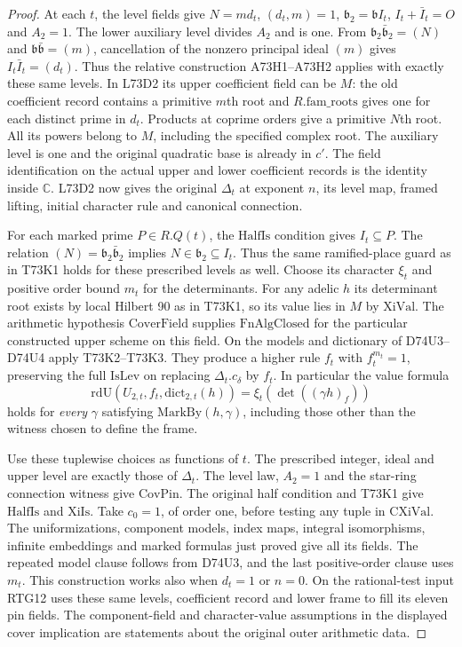 \begin{proof}
At each $t$, the level fields give $N=md_t$, $(d_t,m)=1$,
$\mathfrak b_2=\mathfrak b I_t$, $I_t+\bar I_t=O$ and $A_2=1$.
The lower auxiliary level divides $A_2$ and is one. From
$\mathfrak b_2\bar{\mathfrak b}_2=(N)$ and
$\mathfrak b\bar{\mathfrak b}=(m)$, cancellation of the nonzero
principal ideal $(m)$ gives $I_t\bar I_t=(d_t)$.
Thus the relative construction A73H1--A73H2 applies with exactly
these same levels. In L73D2 its upper coefficient field can be $M$:
the old coefficient record contains a primitive $m$th root and
$R.\mathrm{fam\_roots}$ gives one for each distinct prime in
$d_t$. Products at coprime orders give a primitive $N$th root.
All its powers belong to $M$, including the specified complex root.
The auxiliary level is one and the original quadratic base is already
in $c'$. The field identification on the actual upper and lower
coefficient records is the identity inside $\mathbb C$. L73D2 now
gives the original $\Delta_t$ at exponent $n$, its level map, framed
lifting, initial character rule and canonical connection.

For each marked prime $P\in R.Q(t)$, the $\mathrm{HalfIs}$ condition
gives $I_t\subseteq P$. The relation $(N)=\mathfrak b_2
\bar{\mathfrak b}_2$ implies $N\in\mathfrak b_2\subseteq I_t$.
Thus the same ramified-place guard as in T73K1 holds for these
prescribed levels as well. Choose its character $\xi_t$ and positive
order bound $m_t$ for the determinants. For any adelic $h$ its
determinant root exists by local Hilbert 90 as in T73K1, so its
value lies in $M$ by $\mathrm{XiVal}$. The arithmetic hypothesis
$\mathrm{CoverField}$ supplies $\mathrm{FnAlgClosed}$ for the
particular constructed upper scheme on this field. On the models and
dictionary of D74U3--D74U4 apply T73K2--T73K3. They produce a
higher rule $f_t$ with $f_t^{m_t}=1$, preserving the full
$\mathrm{IsLev}$ on replacing $\Delta_t.c_\delta$ by $f_t$. In
particular the value formula
\[
 \mathrm{rdU}(U_{2,t}, f_t,\mathrm{dict}_{2,t}(h))
      = \xi_t(\det((\gamma h)_f))
\]
holds for \emph{every} $\gamma$ satisfying
$\mathrm{MarkBy}(h,\gamma)$, including those other than the witness
chosen to define the frame.

Use these tuplewise choices as functions of $t$. The prescribed
integer, ideal and upper level are exactly those of $\Delta_t$.
The level law, $A_2=1$ and the star-ring connection witness give
$\mathrm{CovPin}$. The original half condition and T73K1 give
$\mathrm{HalfIs}$ and $\mathrm{XiIs}$. Take $c_0=1$, of order one,
before testing any tuple in $\mathrm{CXiVal}$. The uniformizations,
component models, index maps, integral isomorphisms, infinite
embeddings and marked formulas just proved give all its fields.
The repeated model clause follows from D74U3, and the last
positive-order clause uses $m_t$. This construction works also when
$d_t=1$ or $n=0$. On the rational-test input RTG12 uses these
same levels, coefficient record and lower frame to fill its eleven
pin fields. The component-field and character-value assumptions in
the displayed cover implication are statements about the original
outer arithmetic data.
\end{proof}
